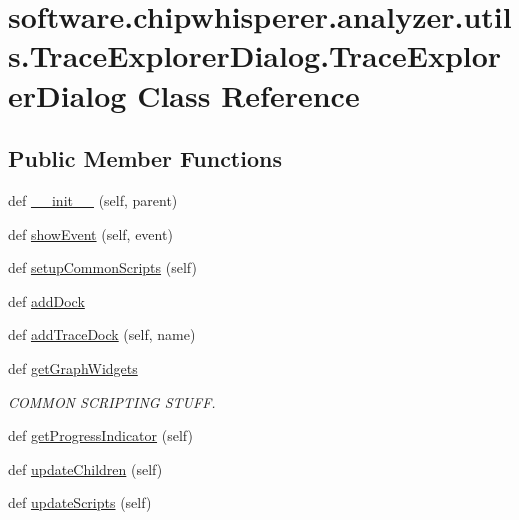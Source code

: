 \hypertarget{classsoftware_1_1chipwhisperer_1_1analyzer_1_1utils_1_1TraceExplorerDialog_1_1TraceExplorerDialog}{}\section{software.\+chipwhisperer.\+analyzer.\+utils.\+Trace\+Explorer\+Dialog.\+Trace\+Explorer\+Dialog Class Reference}
\label{classsoftware_1_1chipwhisperer_1_1analyzer_1_1utils_1_1TraceExplorerDialog_1_1TraceExplorerDialog}
\subsection*{Public Member Functions}
\begin{DoxyCompactItemize}
\item 
def \hyperlink{classsoftware_1_1chipwhisperer_1_1analyzer_1_1utils_1_1TraceExplorerDialog_1_1TraceExplorerDialog_a7d3f4624f42d1392673cd5bd19875061}{\+\_\+\+\_\+init\+\_\+\+\_\+} (self, parent)
\item 
def \hyperlink{classsoftware_1_1chipwhisperer_1_1analyzer_1_1utils_1_1TraceExplorerDialog_1_1TraceExplorerDialog_a3758a82451e6f6c0954f58e49d7b64b8}{show\+Event} (self, event)
\item 
def \hyperlink{classsoftware_1_1chipwhisperer_1_1analyzer_1_1utils_1_1TraceExplorerDialog_1_1TraceExplorerDialog_a216397cd353da7bbda30f17a46e2a407}{setup\+Common\+Scripts} (self)
\item 
def \hyperlink{classsoftware_1_1chipwhisperer_1_1analyzer_1_1utils_1_1TraceExplorerDialog_1_1TraceExplorerDialog_a9e04d904d254833129ef6948e34bf38b}{add\+Dock}
\item 
def \hyperlink{classsoftware_1_1chipwhisperer_1_1analyzer_1_1utils_1_1TraceExplorerDialog_1_1TraceExplorerDialog_a3beaab627c694aeddef1da59babc2692}{add\+Trace\+Dock} (self, name)
\item 
def \hyperlink{classsoftware_1_1chipwhisperer_1_1analyzer_1_1utils_1_1TraceExplorerDialog_1_1TraceExplorerDialog_add9239676bb89ad0a50ebe6dbcfe67f5}{get\+Graph\+Widgets}
\begin{DoxyCompactList}\small\item\em C\+O\+M\+M\+O\+N S\+C\+R\+I\+P\+T\+I\+N\+G S\+T\+U\+F\+F. \end{DoxyCompactList}\item 
def \hyperlink{classsoftware_1_1chipwhisperer_1_1analyzer_1_1utils_1_1TraceExplorerDialog_1_1TraceExplorerDialog_a3e1abced6c8d99b19a5528ce960c747e}{get\+Progress\+Indicator} (self)
\item 
def \hyperlink{classsoftware_1_1chipwhisperer_1_1analyzer_1_1utils_1_1TraceExplorerDialog_1_1TraceExplorerDialog_a2305c7ecf1389f02bfe1614a1ea9e93a}{update\+Children} (self)
\item 
def \hyperlink{classsoftware_1_1chipwhisperer_1_1analyzer_1_1utils_1_1TraceExplorerDialog_1_1TraceExplorerDialog_abb005cf0ef2f77641bebca888ab3ff14}{update\+Scripts} (self)
\end{DoxyCompactItemize}
